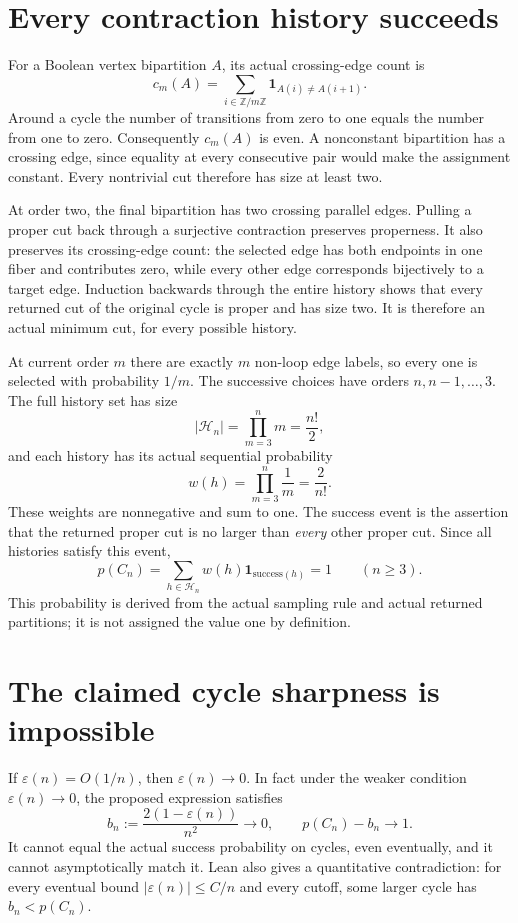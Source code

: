 \documentclass[11pt]{article}
\begin{document}
\newpage
\section*{Every contraction history succeeds}
For a Boolean vertex bipartition $A$, its actual
crossing-edge count is
\[
 c_m(A)=\sum_{i\in\mathbb Z/m\mathbb Z}
              \boldsymbol{1}_{A(i)\ne A(i+1)}.
\]
Around a cycle the number of transitions from zero to
one equals the number from one to zero. Consequently
$c_m(A)$ is even. A nonconstant bipartition has a
crossing edge, since equality at every consecutive
pair would make the assignment constant. Every
nontrivial cut therefore has size at least two.

At order two, the final bipartition has two crossing
parallel edges. Pulling a proper cut back through a
surjective contraction preserves properness. It also
preserves its crossing-edge count: the selected edge
has both endpoints in one fiber and contributes zero,
while every other edge corresponds bijectively to a
target edge. Induction backwards through the entire
history shows that every returned cut of the original
cycle is proper and has size two. It is therefore an
actual minimum cut, for every possible history.

At current order $m$ there are exactly $m$ non-loop
edge labels, so every one is selected with probability
$1/m$. The successive choices have orders
$n,n-1,\ldots,3$. The full history set has size
\[
 |\mathcal H_n|=\prod_{m=3}^{n}m=\frac{n!}{2},
\]
and each history has its actual sequential probability
\[
 w(h)=\prod_{m=3}^{n}\frac1m=\frac2{n!}.
\]
These weights are nonnegative and sum to one.
The success event is the assertion that the returned
proper cut is no larger than \emph{every} other proper
cut. Since all histories satisfy this event,
\[
 p(C_n)=\sum_{h\in\mathcal H_n}
        w(h)\boldsymbol{1}_{\text{success}(h)}=1
       \qquad(n\geq3).
\]
This probability is derived from the actual sampling
rule and actual returned partitions; it is not assigned
the value one by definition.

\newpage
\section*{The claimed cycle sharpness is impossible}
If $\varepsilon(n)=O(1/n)$, then $\varepsilon(n)\to0$.
In fact under the weaker condition
$\varepsilon(n)\to0$, the proposed expression satisfies
\[
 b_n:=\frac{2(1-\varepsilon(n))}{n^2}\longrightarrow0,
 \qquad p(C_n)-b_n\longrightarrow1.
\]
It cannot equal the actual success probability on
cycles, even eventually, and it cannot asymptotically
match it. Lean also gives a quantitative contradiction:
for every eventual bound $|\varepsilon(n)|\leq C/n$
and every cutoff, some larger cycle has $b_n<p(C_n)$.
\end{document}
